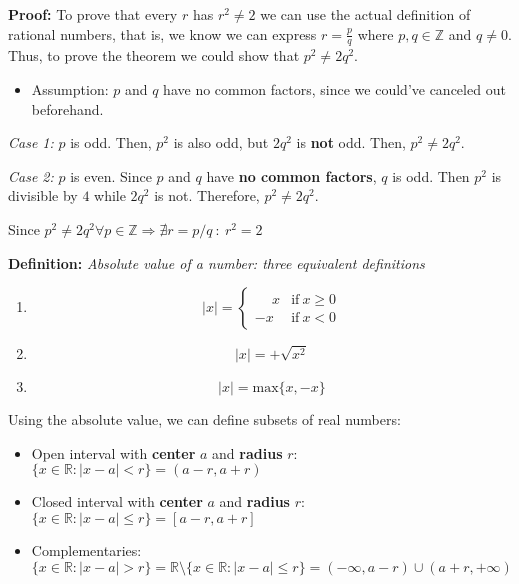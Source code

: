 \documentclass[11pt]{article}
\providecommand{\tightlist}{%
      \setlength{\itemsep}{0pt}\setlength{\parskip}{0pt}}
\begin{document}
\textbf{Proof:} To prove that every \(r\) has \(r^2\neq 2\) we can use
the actual definition of rational numbers, that is, we know we can
express \(r = \frac{p}{q}\) where \(p,q\in\mathbb{Z}\) and \(q\neq 0\).
Thus, to prove the theorem we could show that \(p^2\neq 2q^2\).

\begin{itemize}
\tightlist
\item
  Assumption: \(p\) and \(q\) have no common factors, since we could've
  canceled out beforehand.
\end{itemize}

\emph{Case 1:} \(p\) is odd. Then, \(p^2\) is also odd, but \(2q^2\) is
\textbf{not} odd. Then, \(p^2\neq 2q^2\).

\emph{Case 2:} \(p\) is even. Since \(p\) and \(q\) have \textbf{no
common factors}, \(q\) is odd. Then \(p^2\) is divisible by \(4\) while
\(2q^2\) is not. Therefore, \(p^2\neq 2q^2\).

Since
\(p^2\neq 2q^2 \forall p\in\mathbb{Z}\Rightarrow \nexists r = p / q \ : \ r^2 = 2\)

\textbf{Definition:} \emph{Absolute value of a number: three equivalent
definitions}

\begin{enumerate}
\def\labelenumi{\arabic{enumi}.}
\item
  \[
  \lvert x \rvert =
  \begin{cases}
  \phantom{-}x & \text{if} \ x\geq 0 \\
  -x & \text{if} \ x < 0 
  \end{cases}
  \]
\item
  \[
  \lvert x \rvert = + \sqrt{x^2}
  \]
\item
  \[
  \lvert x \rvert = \text{max}\{x, -x\}
  \]
\end{enumerate}

Using the absolute value, we can define subsets of real numbers:

\begin{itemize}
\tightlist
\item
  Open interval with \textbf{center} \(a\) and \textbf{radius} \(r\):
  \(\{x\in\mathbb{R} : \lvert x-a \rvert < r\} = (a-r,a+r)\)
\item
  Closed interval with \textbf{center} \(a\) and \textbf{radius} \(r\):
  \(\{x\in\mathbb{R} : \lvert x-a \rvert \leq r\} = [a-r,a+r]\)
\item
  Complementaries: \[
  \{x\in\mathbb{R} : \lvert x-a \rvert > r\} = \mathbb{R}\setminus\{x\in\mathbb{R}: \lvert x-a \rvert \leq r\} = (-\infty,a-r)\cup(a+r,+\infty)
  \]
\end{itemize}
\end{document}
